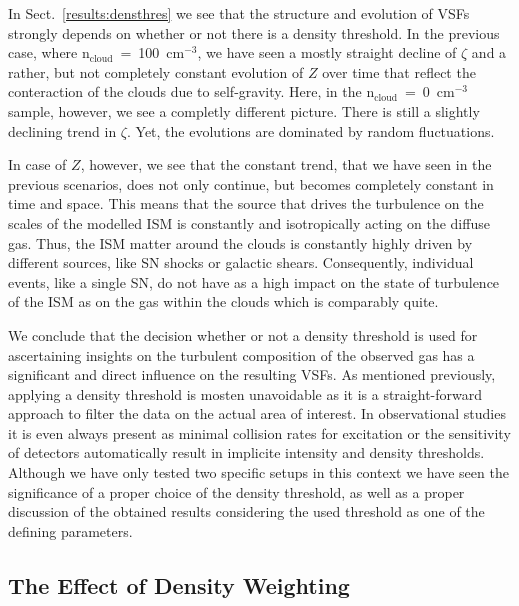 In Sect.~\ref{results:densthres} we see that the structure and evolution of VSFs strongly depends on whether or not there is a density threshold. 
In the previous case, where n$_\mathrm{cloud}$~=~100~cm$^{-3}$, we have seen a mostly straight decline of $\zeta$ and a rather, but not completely constant evolution of $Z$ over time that reflect the conteraction of the clouds due to self-gravity.
Here, in the n$_\mathrm{cloud}$~=~0~cm$^{-3}$ sample, however, we see a completly different picture.
There is still a slightly declining trend in $\zeta$.
Yet, the evolutions are dominated by random fluctuations.

In case of $Z$, however, we see that the constant trend, that we have seen in the previous scenarios, does not only continue, but becomes completely constant in time and space. 
This means that the source that drives the turbulence on the scales of the modelled ISM is constantly and isotropically acting on the diffuse gas.
Thus, the ISM matter around the clouds is constantly highly driven by different sources, like SN shocks or galactic shears.
Consequently, individual events, like a single SN, do not have as a high impact on the state of turbulence of the ISM as on the gas within the clouds which is comparably quite.

We conclude that the decision whether or not a density threshold is used for ascertaining insights on the turbulent composition of the observed gas has a significant and direct influence on the resulting VSFs.
As mentioned previously, applying a density threshold is mosten unavoidable as it is a straight-forward approach to filter the data on the actual area of interest.
In observational studies it is even always present as minimal collision rates for excitation or the sensitivity of detectors automatically result in implicite intensity and density thresholds. 
Although we have only tested two specific setups in this context we have seen the significance of a proper choice of the density threshold, as well as a proper discussion of the obtained results considering the used threshold as one of the defining parameters.


\subsection{The Effect of Density Weighting}\label{discussion:densweight}

